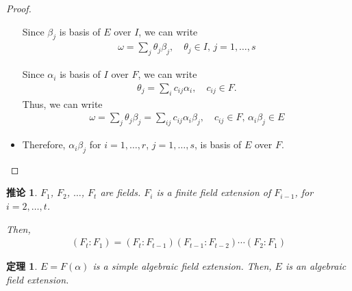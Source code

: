 \documentclass[utf8]{ctexbook}
\newtheorem{theorem}{定理}[section]
\newtheorem{corollary}{推论}[section]
\begin{document}
\begin{proof}
\begin{itemize}
{Since $\beta_j$ is basis of $E$ over $I$, we can write
\begin{align*}
\omega = \sum_j \theta_j \beta_j , \quad \theta_j \in I, \, j = 1, \ldots, s
\end{align*}

Since $\alpha_i$ is basis of $I$ over $F$, we can write
\begin{align*}
\theta_j = \sum_i c_{ij} \alpha_i, \quad c_{ij} \in F .
\end{align*}
Thus, we can write
\begin{align*}
\omega = \sum_j \theta_j \beta_j = \sum_{ij} c_{ij} \alpha_i \beta_j, \quad c_{ij} \in F, \, \alpha_i \beta_j \in E
\end{align*}
}
\item{Therefore, $\alpha_i \beta_j$ for $i= 1, \ldots, r$, $j = 1, \ldots, s$, is basis of $E$ over $F$.}
\end{itemize}


\end{proof}


\begin{corollary}
$F_1$, $F_2$, $\ldots$, $F_t$ are fields. $F_i$ is a finite field extension of $F_{i-1}$, for $i=2, \ldots, t$.

Then,
\begin{align*}
(F_t : F_1) = (F_t : F_{t-1}) (F_{t-1} : F_{t-2} ) \cdots (F_2 : F_1)
\end{align*}
\end{corollary}


\begin{theorem}\label{theorem_4_3_2_simple_extension_algebraic}
$E = F(\alpha)$ is a simple algebraic field extension. Then, $E$ is an algebraic field extension.
\end{theorem}
\end{document}
